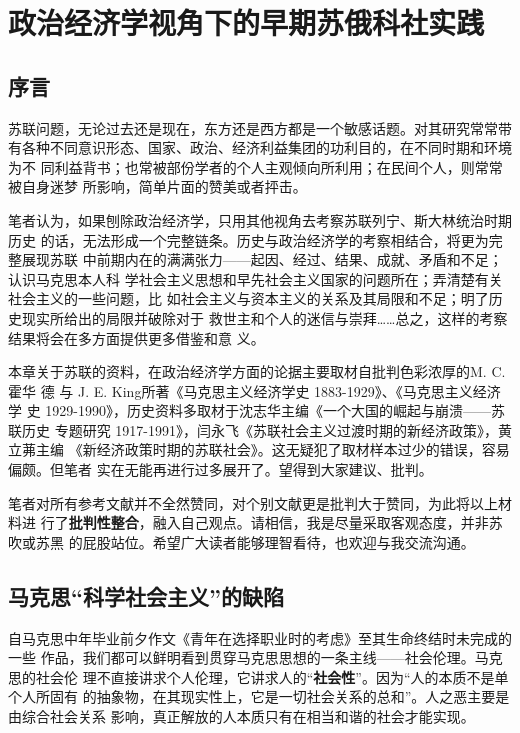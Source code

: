 \chapter[早期苏俄科社实践]{政治经济学视角下的早期苏俄科社实践}
\label{chap:russiachina}

\section{序言}

苏联问题，无论过去还是现在，东方还是西方都是一个敏感话题。对其研究常常带
有各种不同意识形态、国家、政治、经济利益集团的功利目的，在不同时期和环境为不
同利益背书；也常被部份学者的个人主观倾向所利用；在民间个人，则常常被自身迷梦
所影响，简单片面的赞美或者抨击。

笔者认为，如果刨除政治经济学，只用其他视角去考察苏联列宁、斯大林统治时期历史
的话，无法形成一个完整链条。历史与政治经济学的考察相结合，将更为完整展现苏联
中前期内在的满满张力——起因、经过、结果、成就、矛盾和不足；认识马克思本人科
学社会主义思想和早先社会主义国家的问题所在；弄清楚有关社会主义的一些问题，比
如社会主义与资本主义的关系及其局限和不足；明了历史现实所给出的局限并破除对于
救世主和个人的迷信与崇拜……总之，这样的考察结果将会在多方面提供更多借鉴和意
义。

本章关于苏联的资料，在政治经济学方面的论据主要取材自批判色彩浓厚的M. C. 霍华
德 与 J. E. King所著《马克思主义经济学史 1883-1929》、《马克思主义经济学
史 1929-1990》，历史资料多取材于沈志华主编《一个大国的崛起与崩溃——苏联历史
专题研究 1917-1991》，闫永飞《苏联社会主义过渡时期的新经济政策》，黄立茀主编
《新经济政策时期的苏联社会》。这无疑犯了取材样本过少的错误，容易偏颇。但笔者
实在无能再进行过多展开了。望得到大家建议、批判。

笔者对所有参考文献并不全然赞同，对个别文献更是批判大于赞同，为此将以上材料进
行了\textbf{批判性整合}，融入自己观点。请相信，我是尽量采取客观态度，并非苏吹或苏黑
的屁股站位。希望广大读者能够理智看待，也欢迎与我交流沟通。

\section{马克思“科学社会主义”的缺陷}
\label{sec:marxkexue}

自马克思中年毕业前夕作文《青年在选择职业时的考虑》至其生命终结时未完成的一些
作品，我们都可以鲜明看到贯穿马克思思想的一条主线——社会伦理。马克思的社会伦
理不直接讲求个人伦理，它讲求人的“\textbf{社会性}”。因为“人的本质不是单个人所固有
的抽象物，在其现实性上，它是一切社会关系的总和”。人之恶主要是由综合社会关系
影响，真正解放的人本质只有在相当和谐的社会才能实现。

